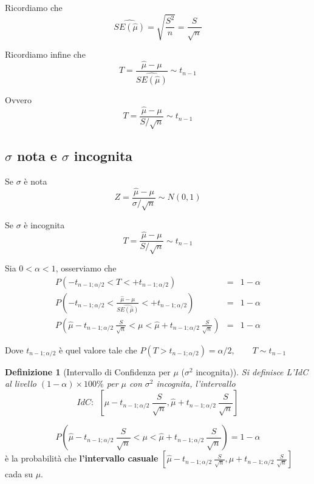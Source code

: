 \documentclass[
  11pt,
]{book}
\theoremstyle{mytheoremstyle}
\theoremstyle{mydefstyle}
\newtheorem{definition}{Definizione}[section]
\begin{document}
Ricordiamo che
\[\widehat{SE(\hat\mu)}=\sqrt{\frac {S^2}n}=\frac S {\sqrt n}\]

Ricordiamo infine che
\[T=\frac{\hat \mu-\mu}{\widehat{SE(\hat\mu)}}\sim t_{n-1}\]

Ovvero
\[T=\frac{\hat \mu-\mu}{S/\sqrt n}\sim t_{n-1}\]

\subsection{\texorpdfstring{\(\sigma\) nota e \(\sigma\) incognita}{\textbackslash sigma nota e \textbackslash sigma incognita}}\label{sigma-nota-e-sigma-incognita}

Se \(\sigma\) è nota
\[Z=\frac{\hat \mu-\mu}{\sigma/\sqrt n}\sim N(0,1)\]

Se \(\sigma\) è incognita
\[T=\frac{\hat \mu-\mu}{S/\sqrt n}\sim t_{n-1}\]

Sia \(0<\alpha<1\), osserviamo che
\begin{eqnarray*}
  P(-t_{n-1;\alpha/2}<T<+t_{n-1;\alpha/2}) &=& 1-\alpha \\
  P\left(-t_{n-1;\alpha/2}<\frac{\hat \mu -\mu}{\widehat{SE(\hat \mu)}}< +t_{n-1;\alpha/2}\right) &=& 1-\alpha \\
  P\left(\hat \mu- t_{n-1;\alpha/2}~\frac S{\sqrt n}<\mu<\hat \mu+t_{n-1;\alpha/2}~\frac S{\sqrt n}\right) &=& 1-\alpha
\end{eqnarray*}

Dove \(t_{n-1;\alpha/2}\) è quel valore tale che \(P(T>t_{n-1;\alpha/2})=\alpha/2,\qquad T\sim t_{n-1}\)

\begin{info}

\begin{definition}[Intervallo di Confidenza per $\mu$ ($\sigma^2$ incognita)]
Si definisce L'IdC al livello \((1-\alpha)\times100\%\) per \(\mu\) con \(\sigma^2\) incognita, l'intervallo
\[IdC:~~\left[\hat \mu- t_{n-1;\alpha/2}~\frac S{\sqrt n},\hat \mu+ t_{n-1;\alpha/2}~\frac S{\sqrt n}\right]\]
\end{definition}

\end{info}

\[  P\left(\hat \mu- t_{n-1;\alpha/2}~\frac S{\sqrt n}<\mu<\hat \mu+t_{n-1;\alpha/2}~\frac S{\sqrt n}\right) = 1-\alpha\]
è la probabilità che \textbf{l'intervallo casuale} \(\left[\hat \mu- t_{n-1;\alpha/2}~\frac S{\sqrt n},\hat \mu+ t_{n-1;\alpha/2}~\frac S{\sqrt n}\right]\) cada su \(\mu\).
\end{document}
